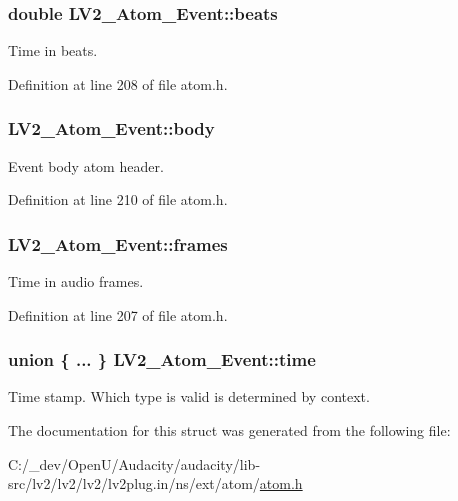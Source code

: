 \subsubsection[{\texorpdfstring{beats}{beats}}]{\setlength{\rightskip}{0pt plus 5cm}double L\+V2\+\_\+\+Atom\+\_\+\+Event\+::beats}\hypertarget{struct_l_v2___atom___event_a87293467e3d56022f36af63034a40041}{}\label{struct_l_v2___atom___event_a87293467e3d56022f36af63034a40041}
Time in beats. 

Definition at line 208 of file atom.\+h.

\subsubsection[{\texorpdfstring{body}{body}}]{ L\+V2\+\_\+\+Atom\+\_\+\+Event\+::body}\hypertarget{struct_l_v2___atom___event_a274e3113f8a11d44f6289a5546eadffb}{}\label{struct_l_v2___atom___event_a274e3113f8a11d44f6289a5546eadffb}
Event body atom header. 

Definition at line 210 of file atom.\+h.

\subsubsection[{\texorpdfstring{frames}{frames}}]{ L\+V2\+\_\+\+Atom\+\_\+\+Event\+::frames}\hypertarget{struct_l_v2___atom___event_a255dbfc7b1fa24a2852de67ebf239c6d}{}\label{struct_l_v2___atom___event_a255dbfc7b1fa24a2852de67ebf239c6d}
Time in audio frames. 

Definition at line 207 of file atom.\+h.

\subsubsection[{\texorpdfstring{time}{time}}]{\setlength{\rightskip}{0pt plus 5cm}union \{ ... \}   L\+V2\+\_\+\+Atom\+\_\+\+Event\+::time}\hypertarget{struct_l_v2___atom___event_aebc047bffd25fcb780c8f6abbf973da9}{}\label{struct_l_v2___atom___event_aebc047bffd25fcb780c8f6abbf973da9}
Time stamp. Which type is valid is determined by context. 

The documentation for this struct was generated from the following file\+:\begin{DoxyCompactItemize}
\item 
C\+:/\+\_\+dev/\+Open\+U/\+Audacity/audacity/lib-\/src/lv2/lv2/lv2/lv2plug.\+in/ns/ext/atom/\hyperlink{atom_8h}{atom.\+h}\end{DoxyCompactItemize}
